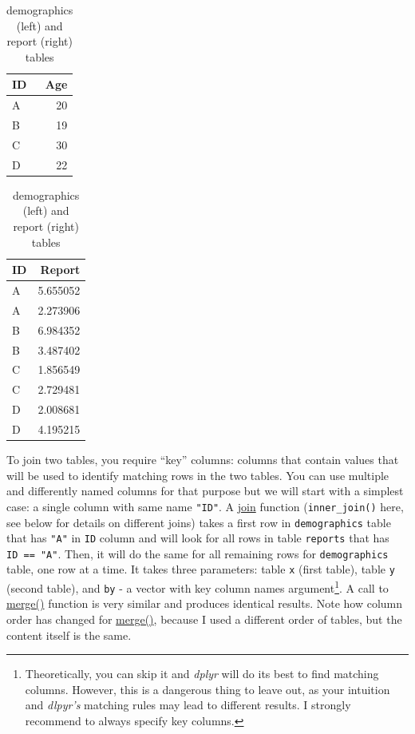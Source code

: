 \documentclass[
]{book}
\begin{document}
\begin{table}
\caption{\label{tab:unnamed-chunk-176}demographics (left) and report (right) tables}

\centering
\begin{tabular}[t]{l|r}
\hline
ID & Age\\
\hline
A & 20\\
\hline
B & 19\\
\hline
C & 30\\
\hline
D & 22\\
\hline
\end{tabular}
\centering
\begin{tabular}[t]{l|r}
\hline
ID & Report\\
\hline
A & 5.655052\\
\hline
A & 2.273906\\
\hline
B & 6.984352\\
\hline
B & 3.487402\\
\hline
C & 1.856549\\
\hline
C & 2.729481\\
\hline
D & 2.008681\\
\hline
D & 4.195215\\
\hline
\end{tabular}
\end{table}

To join two tables, you require ``key'' columns: columns that contain values that will be used to identify matching rows in the two tables. You can use multiple and differently named columns for that purpose but we will start with a simplest case: a single column with same name \texttt{"ID"}. A \href{https://dplyr.tidyverse.org/reference/mutate-joins.html}{join} function (\texttt{inner\_join()} here, see below for details on different joins) takes a first row in \texttt{demographics} table that has \texttt{"A"} in \texttt{ID} column and will look for all rows in table \texttt{reports} that has \texttt{ID\ ==\ "A"}. Then, it will do the same for all remaining rows for \texttt{demographics} table, one row at a time. It takes three parameters: table \texttt{x} (first table), table \texttt{y} (second table), and \texttt{by} - a vector with key column names argument\footnote{Theoretically, you can skip it and \emph{dplyr} will do its best to find matching columns. However, this is a dangerous thing to leave out, as your intuition and \emph{dlpyr's} matching rules may lead to different results. I strongly recommend to always specify key columns.}. A call to \href{https://stat.ethz.ch/R-manual/R-devel/library/base/html/merge.html}{merge()} function is very similar and produces identical results. Note how column order has changed for \href{https://stat.ethz.ch/R-manual/R-devel/library/base/html/merge.html}{merge()}, because I used a different order of tables, but the content itself is the same.
\end{document}
